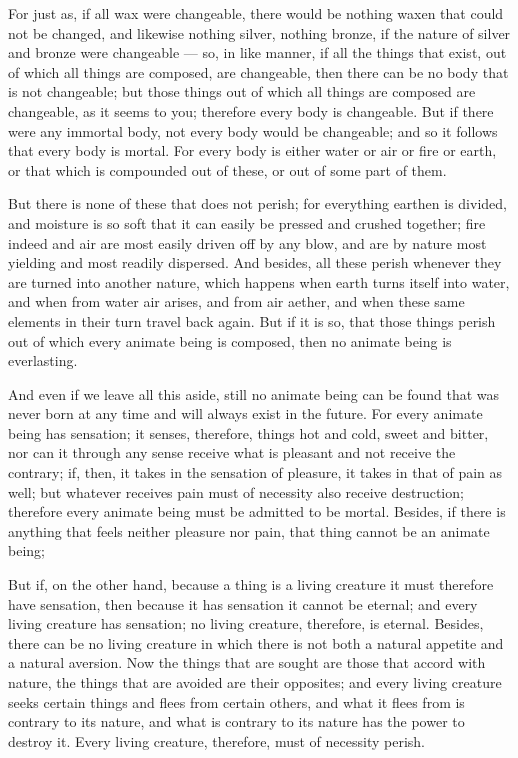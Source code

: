  For just as, if all wax were changeable, there would be nothing waxen that could not be changed, and likewise nothing silver, nothing bronze, if the nature of silver and bronze were changeable — so, in like manner, if all the things that exist, out of which all things are composed, are changeable, then there can be no body that is not changeable; but those things out of which all things are composed are changeable, as it seems to you; therefore every body is changeable. But if there were any immortal body, not every body would be changeable; and so it follows that every body is mortal. For every body is either water or air or fire or earth, or that which is compounded out of these, or out of some part of them.

 But there is none of these that does not perish; for everything earthen is divided, and moisture is so soft that it can easily be pressed and crushed together; fire indeed and air are most easily driven off by any blow, and are by nature most yielding and most readily dispersed. And besides, all these perish whenever they are turned into another nature, which happens when earth turns itself into water, and when from water air arises, and from air aether, and when these same elements in their turn travel back again. But if it is so, that those things perish out of which every animate being is composed, then no animate being is everlasting.

 And even if we leave all this aside, still no animate being can be found that was never born at any time and will always exist in the future. For every animate being has sensation; it senses, therefore, things hot and cold, sweet and bitter, nor can it through any sense receive what is pleasant and not receive the contrary; if, then, it takes in the sensation of pleasure, it takes in that of pain as well; but whatever receives pain must of necessity also receive destruction; therefore every animate being must be admitted to be mortal. Besides, if there is anything that feels neither pleasure nor pain, that thing cannot be an animate being;

 But if, on the other hand, because a thing is a living creature it must therefore have sensation, then because it has sensation it cannot be eternal; and every living creature has sensation; no living creature, therefore, is eternal. Besides, there can be no living creature in which there is not both a natural appetite and a natural aversion. Now the things that are sought are those that accord with nature, the things that are avoided are their opposites; and every living creature seeks certain things and flees from certain others, and what it flees from is contrary to its nature, and what is contrary to its nature has the power to destroy it. Every living creature, therefore, must of necessity perish.

